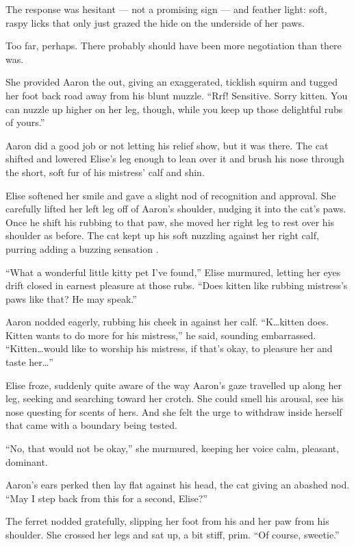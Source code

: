 The response was hesitant --- not a promising sign --- and feather light: soft, raspy licks that only just grazed the hide on the underside of her paws.

Too far, perhaps. There probably should have been more negotiation than there was.

She provided Aaron the out, giving an exaggerated, ticklish squirm and tugged her foot back road away from his blunt muzzle. ``Rrf! Sensitive. Sorry kitten. You can nuzzle up higher on her leg, though, while you keep up those delightful rubs of yours.''

Aaron did a good job or not letting his relief show, but it was there. The cat shifted and lowered Elise's leg enough to lean over it and brush his nose through the short, soft fur of his mistress' calf and shin.

Elise softened her smile and gave a slight nod of recognition and approval. She carefully lifted her left leg off of Aaron's shoulder, nudging it into the cat's paws. Once he shift his rubbing to that paw, she moved her right leg to rest over his shoulder as before. The cat kept up his soft nuzzling against her right calf, purring adding a buzzing sensation .

``What a wonderful little kitty pet I've found,'' Elise murmured, letting her eyes drift closed in earnest pleasure at those rubs. ``Does kitten like rubbing mistress's paws like that? He may speak.''

Aaron nodded eagerly, rubbing his cheek in against her calf. ``K\ldots{}kitten does. Kitten wants to do more for his mistress,'' he said, sounding embarrassed. ``Kitten\ldots{}would like to worship his mistress, if that's okay, to pleasure her and taste her\ldots{}''

Elise froze, suddenly quite aware of the way Aaron's gaze travelled up along her leg, seeking and searching toward her crotch. She could smell his arousal, see his nose questing for scents of hers. And she felt the urge to withdraw inside herself that came with a boundary being tested.

``No, that would not be okay,'' she murmured, keeping her voice calm, pleasant, dominant.

Aaron's ears perked then lay flat against his head, the cat giving an abashed nod. ``May I step back from this for a second, Elise?''

The ferret nodded gratefully, slipping her foot from his and her paw from his shoulder. She crossed her legs and sat up, a bit stiff, prim. ``Of course, sweetie.''

